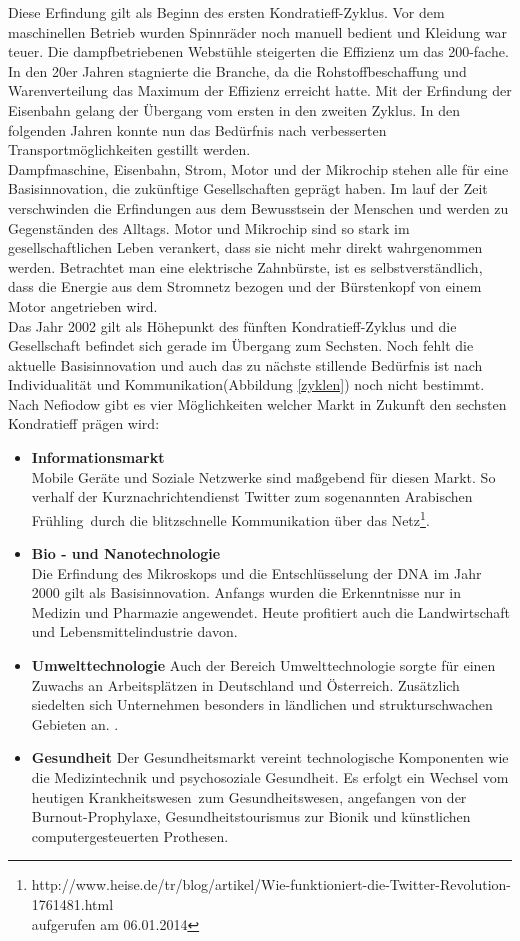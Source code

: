 Diese Erfindung gilt als Beginn des ersten Kondratieff-Zyklus. Vor dem maschinellen Betrieb wurden Spinnräder noch manuell bedient und Kleidung war teuer. Die dampfbetriebenen Webstühle steigerten
die Effizienz um das 200-fache. In den 20er Jahren stagnierte die Branche, da die Rohstoffbeschaffung und Warenverteilung das Maximum der Effizienz erreicht hatte. Mit der Erfindung der Eisenbahn gelang der Übergang vom ersten in den zweiten Zyklus. In den folgenden Jahren konnte nun das Bedürfnis nach verbesserten Transportmöglichkeiten gestillt werden.\\
Dampfmaschine, Eisenbahn, Strom, Motor und der Mikrochip stehen alle für eine Basisinnovation, die zukünftige Gesellschaften geprägt haben. Im lauf der Zeit verschwinden die Erfindungen aus dem Bewusstsein der Menschen und werden zu Gegenständen des Alltags. Motor und Mikrochip sind so stark im gesellschaftlichen Leben verankert, dass sie nicht mehr direkt wahrgenommen werden. Betrachtet man eine elektrische Zahnbürste, ist es selbstverständlich, dass die Energie aus dem Stromnetz bezogen und der Bürstenkopf von einem Motor angetrieben wird.\\
Das Jahr 2002 gilt als Höhepunkt des fünften Kondratieff-Zyklus und die Gesellschaft befindet sich gerade im Übergang zum Sechsten. Noch fehlt die aktuelle Basisinnovation und auch das zu nächste stillende Bedürfnis ist nach Individualität und Kommunikation(Abbildung \ref{zyklen}) noch nicht bestimmt.\\
Nach Nefiodow \cite{nefiodow:gesundheit} gibt es vier Möglichkeiten welcher Markt in Zukunft den sechsten Kondratieff prägen wird:
\begin{itemize}
  \item \textbf{Informationsmarkt} \\
  		Mobile Geräte und Soziale Netzwerke sind maßgebend für diesen Markt. So verhalf der Kurznachrichtendienst Twitter zum sogenannten \glqq Arabischen Frühling\grqq\, durch die blitzschnelle Kommunikation über das Netz\footnote{http://www.heise.de/tr/blog/artikel/Wie-funktioniert-die-Twitter-Revolution-1761481.html \\aufgerufen am 06.01.2014}.
  \item \textbf{Bio - und Nanotechnologie} \\
  		Die Erfindung des Mikroskops und die Entschlüsselung der DNA im Jahr 2000 gilt als Basisinnovation. Anfangs wurden die Erkenntnisse nur in Medizin und Pharmazie angewendet. Heute profitiert auch die Landwirtschaft und Lebensmittelindustrie davon.
  \item \textbf{Umwelttechnologie}
  		Auch der Bereich Umwelttechnologie sorgte für einen Zuwachs an Arbeitsplätzen in Deutschland und Österreich. Zusätzlich siedelten sich Unternehmen besonders in ländlichen und strukturschwachen Gebieten an. \cite[S. 107]{nefiodow:gesundheit}.
  \item \textbf{Gesundheit}
  		Der Gesundheitsmarkt vereint technologische Komponenten wie die Medizintechnik und psychosoziale Gesundheit. Es erfolgt ein Wechsel vom heutigen \glqq Krankheitswesen\grqq\ zum Gesundheitswesen, angefangen von der Burnout-Prophylaxe, Gesundheitstourismus zur Bionik und künstlichen computergesteuerten Prothesen.
\end{itemize}

